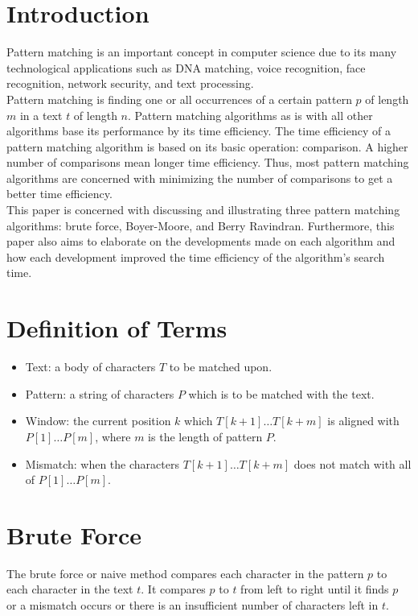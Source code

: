 \section{Introduction}
 Pattern matching is an important concept in computer science due to its many technological applications such as DNA matching, voice recognition, face recognition, network security, and text processing.
\\
Pattern matching is finding one or all occurrences of a certain pattern $p$ of length $m$ in a text $t$ of length $n$. Pattern matching algorithms as is with all other algorithms base its performance by its time efficiency. The time efficiency of a pattern matching algorithm is based on its basic operation: comparison. A higher number of comparisons mean longer time efficiency. Thus, most pattern matching algorithms are concerned with minimizing the number of comparisons to get a better time efficiency.
\\
This paper is concerned with discussing and illustrating three pattern matching algorithms: brute force, Boyer-Moore, and Berry Ravindran. Furthermore, this paper also aims to elaborate on the developments made on each algorithm and how each development improved the time efficiency of the algorithm's search time.
\section{Definition of Terms}

\begin{itemize}
	\item Text: a body of characters $T$ to be matched upon.
	\item Pattern: a string of characters $P$ which is to be matched with the text.
  \item Window: the current position $k$ which $T[k+1]\ldots T[k+m]$ is aligned with $P[1]\ldots P[m]$, where $m$ is the length of pattern $P$.
  \item Mismatch: when the characters $T[k+1]\ldots T[k+m]$ does not match with all of $P[1]\ldots P[m]$.
\end{itemize}

\section{Brute Force}
The brute force or naive method compares each character in the pattern $p$ to each character in the text $t$. It compares $p$ to $t$ from left to right until it finds $p$ or a mismatch occurs or there is an insufficient number of characters left in $t$. 
